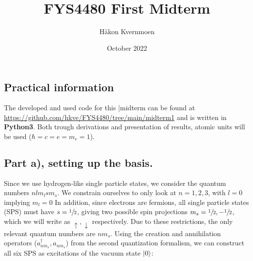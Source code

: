 \documentclass{article}
\title{FYS4480 First Midterm}
\author{Håkon Kvernmoen}
\date{October 2022}
\newcommand{\vac}{\ket{0}}
\newcommand{\crt}[1]{a_{#1}^{\dagger}}
\newcommand{\ani}[1]{a_{#1}}
\begin{document}
\maketitle

\subsection*{Practical information}
    The developed and used code for this |midterm can be found at \url{https://github.com/hkve/FYS4480/tree/main/midterm1} and is written in \textbf{Python3}. Both trough derivations and presentation of results, atomic units will be used ($\hbar = c = e = m_e = 1$).

\subsection*{Part a), setting up the basis.}
    Since we use hydrogen-like single particle states, we consider the quantum numbers $nlm_l sm_s$. We constrain ourselves to only look at $n = 1,2,3$, with $l = 0$ implying $m_l = 0$ In addition, since electrons are fermions, all single particle states (SPS) must have $s = \sfrac{1}{2}$, giving two possible spin projections $m_s = \sfrac{1}{2}, -\sfrac{1}{2}$, which we will write as $\uparrow, \downarrow$ respectively. Due to these restrictions, the only relevant quantum numbers are $nm_s$. Using the creation and annihilation operators ($\crt{nm_s}, \ani{nm_s}$) from the second quantization formalism, we can construct all six SPS as excitations of the vacuum state $\vac$:
    
\end{document}

